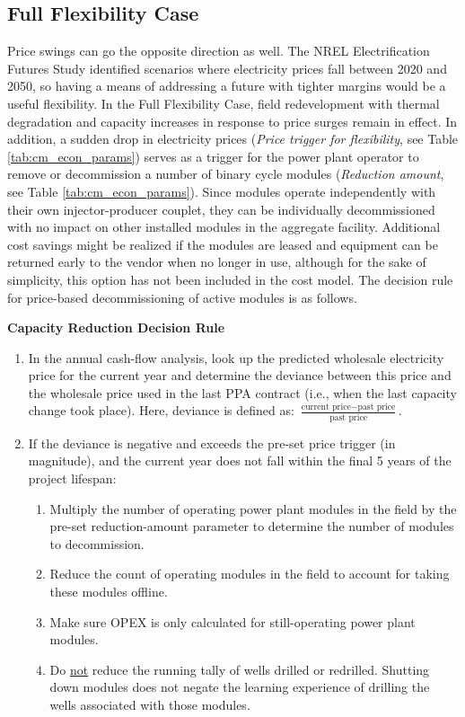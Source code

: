 \subsection{Full Flexibility Case}\label{ch4:flex_reduce_case}

Price swings can go the opposite direction as well. The NREL Electrification Futures Study \citep{murphy_electrification_2021} identified scenarios where electricity prices fall between 2020 and 2050, so having a means of addressing a future with tighter margins would be a useful flexibility. In the Full Flexibility Case, field redevelopment with thermal degradation and capacity increases in response to price surges remain in effect. In addition, a sudden drop in electricity prices (\textit{Price trigger for flexibility}, see Table \ref{tab:cm_econ_params}) serves as a trigger for the power plant operator to remove or decommission a number of binary cycle modules (\textit{Reduction amount}, see Table \ref{tab:cm_econ_params}). Since modules operate independently with their own injector-producer couplet, they can be individually decommissioned with no impact on other installed modules in the aggregate facility. Additional cost savings might be realized if the modules are leased and equipment can be returned early to the vendor when no longer in use, although for the sake of simplicity, this option has not been included in the cost model. The decision rule for price-based decommissioning of active modules is as follows.

\noindent
\textbf{Capacity Reduction Decision Rule}\label{ch4:dr_reduce}
\begin{enumerate}
    \item In the annual cash-flow analysis, look up the predicted wholesale electricity price for the current year and determine the deviance between this price and the wholesale price used in the last PPA contract (i.e., when the last capacity change took place). Here, deviance is defined as: \(\frac{\text{current price} - \text{past price}}{\text{past price}}\).
    \item If the deviance is negative and exceeds the pre-set price trigger (in magnitude), and the current year does not fall within the final 5 years of the project lifespan:
    \begin{enumerate}
        \item Multiply the number of operating power plant modules in the field by the pre-set reduction-amount parameter to determine the number of modules to decommission.
        \item Reduce the count of operating modules in the field to account for taking these modules offline.
        \item Make sure OPEX is only calculated for still-operating power plant modules.
        \item Do \underline{not} reduce the running tally of wells drilled or redrilled. Shutting down modules does not negate the learning experience of drilling the wells associated with those modules.
    \end{enumerate}
\end{enumerate}

